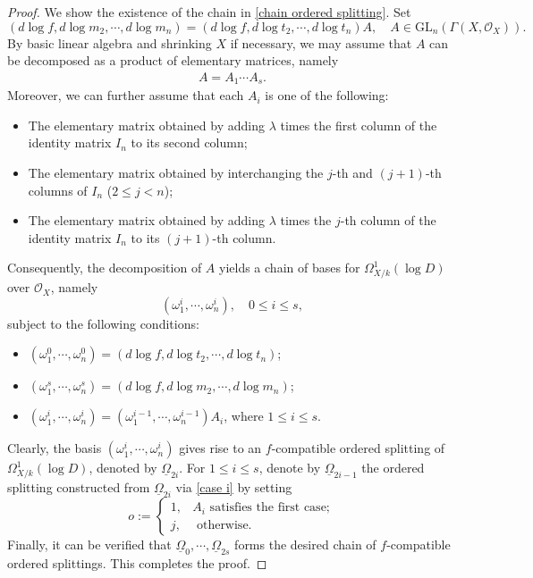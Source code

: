 \documentclass[12pt, a4paper]{article}
\begin{document}
\begin{proof}
We show the existence of the chain in \eqref{chain ordered splitting}. Set
\[
(d\log f, d\log m_2, \cdots, d\log m_n) = (d\log f, d\log t_2, \cdots, d\log t_n) A, \quad A \in \mathrm{GL}_n(\Gamma(X, \mathcal{O}_X)).
\]
By basic linear algebra and shrinking \( X \) if necessary, we may assume that \( A \) can be decomposed as a product of elementary matrices, namely
\begin{eqnarray}\label{decomposition A}
A = A_1 \cdots A_s.
\end{eqnarray}
Moreover, we can further assume that each \( A_i \) is one of the following:
\begin{itemize}
    \item The elementary matrix obtained by adding \( \lambda \) times the first column of the identity matrix \( I_n \) to its second column;
    \item The elementary matrix obtained by interchanging the \( j \)-th and \( (j+1) \)-th columns of \( I_n \) (\( 2 \leq j < n \));
    \item The elementary matrix obtained by adding \( \lambda \) times the \( j \)-th column of the identity matrix \( I_n \) to its \( (j+1) \)-th column.
\end{itemize}
Consequently, the decomposition of \( A \) yields a chain of bases for \( \Omega^1_{X/k}(\log D) \) over \( \mathcal{O}_X \), namely
\[
(\omega_1^i, \cdots, \omega_n^i), \quad 0 \leq i \leq s,
\]
subject to the following conditions:
\begin{itemize}
    \item \( (\omega_1^0, \cdots, \omega_n^0) = (d\log f, d\log t_2, \cdots, d\log t_n) \);
    \item \( (\omega_1^s, \cdots, \omega_n^s) = (d\log f, d\log m_2, \cdots, d\log m_n) \);
    \item \( (\omega_1^i, \cdots, \omega_n^i) = (\omega_1^{i-1}, \cdots, \omega_n^{i-1}) A_i \), where \( 1 \leq i \leq s \).
\end{itemize}
Clearly, the basis \( (\omega_1^i, \cdots, \omega_n^i) \) gives rise to an $f$-compatible ordered splitting of \( \Omega^1_{X/k}(\log D) \), denoted by \( \underline\Omega_{2i} \). For \( 1 \leq i \leq s \), denote by \( \underline\Omega_{2i-1} \) the ordered splitting constructed from \( \underline\Omega_{2i} \) via \eqref{case i} by setting
\[
o := \left\{
\begin{matrix}
1, & A_i \text{ satisfies the first case}; \\
j, & \text{ otherwise}.
\end{matrix}
\right.
\]
Finally, it can be verified that \( \underline\Omega_0, \cdots, \underline\Omega_{2s} \) forms the desired chain of \( f \)-compatible ordered splittings. This completes the proof.
\end{proof}
\end{document}
